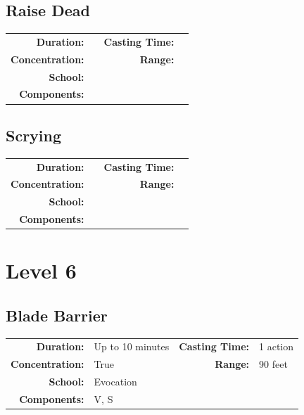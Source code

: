 \documentclass[12pt,showtrims]{memoir}
\begin{document}
\section*{Raise Dead}
{
\small\centering\vspace{-6pt}
\begin{tabular}{rlrl}
\toprule

\textbf{Duration:} &  &
\textbf{Casting Time:} &  \\
\textbf{Concentration:} & &
\textbf{Range:} &  \\
\textbf{School:} &  \\
\textbf{Components:} & \multicolumn{3}{p{0.7\textwidth}}{}\\

\bottomrule
\end{tabular}
}
\newpage
\section*{Scrying}
{
\small\centering\vspace{-6pt}
\begin{tabular}{rlrl}
\toprule

\textbf{Duration:} &  &
\textbf{Casting Time:} &  \\
\textbf{Concentration:} & &
\textbf{Range:} &  \\
\textbf{School:} &  \\
\textbf{Components:} & \multicolumn{3}{p{0.7\textwidth}}{}\\

\bottomrule
\end{tabular}
}
\newpage
\chapter*{Level 6} 
\section*{Blade Barrier}

{
\small\centering\vspace{-6pt}
\begin{tabular}{rlrl}
\toprule

\textbf{Duration:} & Up to 10 minutes &
\textbf{Casting Time:} & 1 action \\
\textbf{Concentration:} & True &
\textbf{Range:} & 90 feet \\
\textbf{School:} & Evocation \\
\textbf{Components:} & \multicolumn{3}{p{0.7\textwidth}}{V, S}\\

\bottomrule
\end{tabular}
}
\end{document}
